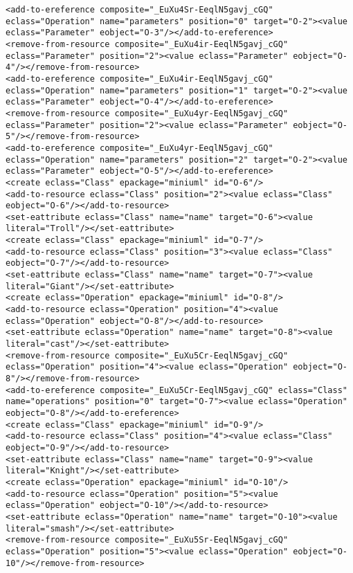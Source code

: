 \begin{lstlisting}[style=cbpfile,caption={Change-based representation of the model in Figure \ref{fig:class_diagram_left}.},label=lst:class_diagram_left_cbpfile]
<add-to-ereference composite="_EuXu4Sr-EeqlN5gavj_cGQ" eclass="Operation" name="parameters" position="0" target="O-2"><value eclass="Parameter" eobject="O-3"/></add-to-ereference>
<remove-from-resource composite="_EuXu4ir-EeqlN5gavj_cGQ" eclass="Parameter" position="2"><value eclass="Parameter" eobject="O-4"/></remove-from-resource>
<add-to-ereference composite="_EuXu4ir-EeqlN5gavj_cGQ" eclass="Operation" name="parameters" position="1" target="O-2"><value eclass="Parameter" eobject="O-4"/></add-to-ereference>
<remove-from-resource composite="_EuXu4yr-EeqlN5gavj_cGQ" eclass="Parameter" position="2"><value eclass="Parameter" eobject="O-5"/></remove-from-resource>
<add-to-ereference composite="_EuXu4yr-EeqlN5gavj_cGQ" eclass="Operation" name="parameters" position="2" target="O-2"><value eclass="Parameter" eobject="O-5"/></add-to-ereference>
<create eclass="Class" epackage="miniuml" id="O-6"/>
<add-to-resource eclass="Class" position="2"><value eclass="Class" eobject="O-6"/></add-to-resource>
<set-eattribute eclass="Class" name="name" target="O-6"><value literal="Troll"/></set-eattribute>
<create eclass="Class" epackage="miniuml" id="O-7"/>
<add-to-resource eclass="Class" position="3"><value eclass="Class" eobject="O-7"/></add-to-resource>
<set-eattribute eclass="Class" name="name" target="O-7"><value literal="Giant"/></set-eattribute>
<create eclass="Operation" epackage="miniuml" id="O-8"/>
<add-to-resource eclass="Operation" position="4"><value eclass="Operation" eobject="O-8"/></add-to-resource>
<set-eattribute eclass="Operation" name="name" target="O-8"><value literal="cast"/></set-eattribute>
<remove-from-resource composite="_EuXu5Cr-EeqlN5gavj_cGQ" eclass="Operation" position="4"><value eclass="Operation" eobject="O-8"/></remove-from-resource>
<add-to-ereference composite="_EuXu5Cr-EeqlN5gavj_cGQ" eclass="Class" name="operations" position="0" target="O-7"><value eclass="Operation" eobject="O-8"/></add-to-ereference>
<create eclass="Class" epackage="miniuml" id="O-9"/>
<add-to-resource eclass="Class" position="4"><value eclass="Class" eobject="O-9"/></add-to-resource>
<set-eattribute eclass="Class" name="name" target="O-9"><value literal="Knight"/></set-eattribute>
<create eclass="Operation" epackage="miniuml" id="O-10"/>
<add-to-resource eclass="Operation" position="5"><value eclass="Operation" eobject="O-10"/></add-to-resource>
<set-eattribute eclass="Operation" name="name" target="O-10"><value literal="smash"/></set-eattribute>
<remove-from-resource composite="_EuXu5Sr-EeqlN5gavj_cGQ" eclass="Operation" position="5"><value eclass="Operation" eobject="O-10"/></remove-from-resource>

\end{lstlisting}
